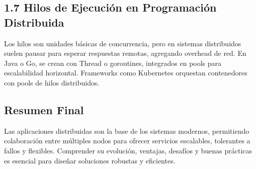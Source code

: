 \documentclass[a4paper,12pt]{article}
\begin{document}
\subsection*{1.7 Hilos de Ejecución en Programación Distribuida}
Los hilos son unidades básicas de concurrencia, pero en sistemas distribuidos suelen pausar para esperar respuestas remotas, agregando overhead de red. En Java o Go, se crean con Thread o goroutines, integrados en pools para escalabilidad horizontal. Frameworks como Kubernetes orquestan contenedores con pools de hilos distribuidos.

\subsection*{Resumen Final}
Las aplicaciones distribuidas son la base de los sistemas modernos, permitiendo colaboración entre múltiples nodos para ofrecer servicios escalables, tolerantes a fallos y flexibles. Comprender su evolución, ventajas, desafíos y buenas prácticas es esencial para diseñar soluciones robustas y eficientes.
\end{document}
